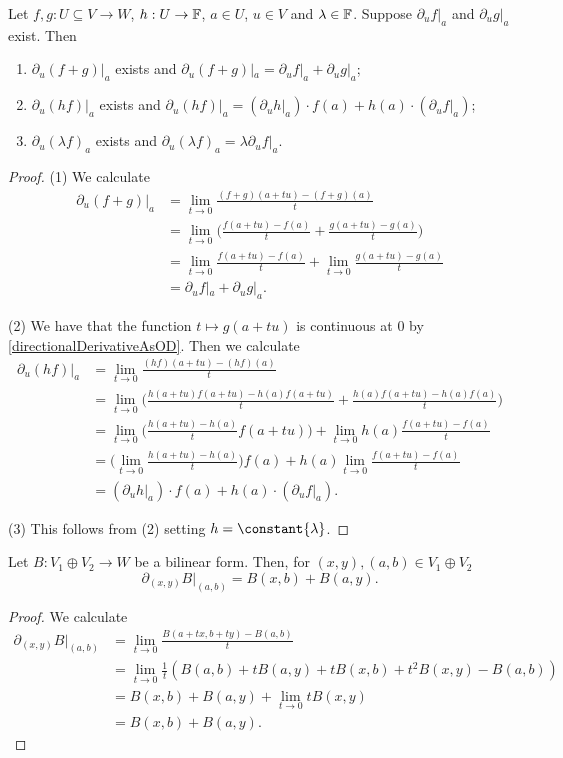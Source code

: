 \begin{lemma} \label{directionalDerivativeConstructions}
Let $f,g: U\subseteq V\to W$, $h: U\to \mathbb{F}$, $a\in U$, $u\in V$ and $\lambda\in\mathbb{F}$. Suppose $\partial_uf|_a$ and $\partial_u g|_a$ exist. Then
\begin{enumerate}
\item $\partial_u(f+g)|_a$ exists and $\partial_u(f+g)|_a = \partial_uf|_a + \partial_u g|_a$;
\item $\partial_u(hf)|_a$ exists and $\partial_u(hf)|_a = (\partial_uh|_a)\cdot f(a) + h(a)\cdot(\partial_u f|_a)$;
\item $\partial_u(\lambda f)_a$ exists and $\partial_u(\lambda f)_a = \lambda \partial_uf|_a$.
\end{enumerate}
\end{lemma}
\begin{proof}
(1) We calculate
\begin{align*}
\partial_u(f+g)|_a &= \lim_{t\to 0} \frac{(f+g)(a+tu) - (f+g)(a)}{t} \\
&= \lim_{t\to 0} \Big(\frac{f(a+tu) - f(a)}{t} + \frac{g(a+tu) - g(a)}{t} \Big) \\
&= \lim_{t\to 0}\frac{f(a+tu) - f(a)}{t} + \lim_{t\to 0} \frac{g(a+tu) - g(a)}{t} \\
&= \partial_uf|_a + \partial_u g|_a.
\end{align*}

(2) We have that the function $t\mapsto g(a+tu)$ is continuous at $0$ by \ref{directionalDerivativeAsOD}. Then we calculate
\begin{align*}
\partial_u(hf)|_a &= \lim_{t\to 0} \frac{(hf)(a+tu) - (hf)(a)}{t} \\
&= \lim_{t\to 0} \Big(\frac{h(a+tu)f(a+tu) - h(a)f(a+tu)}{t} + \frac{h(a)f(a+tu) - h(a)f(a)}{t}\Big) \\
&= \lim_{t\to 0} \Big(\frac{h(a+tu) - h(a)}{t}f(a+tu)\Big) + \lim_{t\to 0}h(a)\frac{f(a+tu) - f(a)}{t} \\
&= \Big(\lim_{t\to 0} \frac{h(a+tu) - h(a)}{t}\Big)f(a) + h(a)\lim_{t\to 0}\frac{f(a+tu) - f(a)}{t} \\
&= (\partial_uh|_a)\cdot f(a) + h(a)\cdot(\partial_u f|_a).
\end{align*}

(3) This follows from (2) setting $h = \constant{\lambda}$.
\end{proof}

\begin{proposition} \label{derivativeBilinearForm}
Let $B: V_1 \oplus V_2 \to W$ be a bilinear form. Then, for $(x,y),(a,b)\in V_1\oplus V_2$
\[ \partial_{(x,y)}B|_{(a,b)} = B(x,b) + B(a,y). \]
\end{proposition}
\begin{proof}
We calculate
\begin{align*}
\partial_{(x,y)}B|_{(a,b)} &= \lim_{t\to 0} \frac{B(a+tx, b+ty) - B(a,b)}{t} \\
&= \lim_{t\to 0} \frac{1}{t} (B(a,b) + tB(a,y) + tB(x,b) + t^2B(x,y) - B(a,b)) \\
&=B(x,b) + B(a,y) + \lim_{t\to 0} tB(x,y) \\
&= B(x,b) + B(a,y).
\end{align*}
\end{proof}


